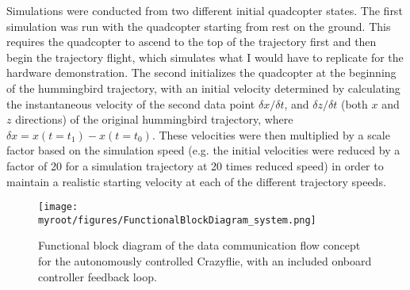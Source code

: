 Simulations were conducted from two different initial quadcopter states. The first simulation was run with the quadcopter starting from rest on the ground. This requires the quadcopter to ascend to the top of the trajectory first and then begin the trajectory flight, which simulates what I would have to replicate for the hardware demonstration. The second initializes the quadcopter at the beginning of the hummingbird trajectory, with an initial velocity determined by calculating the instantaneous velocity of the second data point $\delta x/\delta t$, and $\delta z/\delta t$ (both $x$ and $z$ directions) of the original hummingbird trajectory, where $\delta x = x(t = t_1) - x(t = t_0)$. These velocities were then multiplied by a scale factor based on the simulation speed (e.g. the initial velocities were reduced by a factor of 20 for a simulation trajectory at 20 times reduced speed) in order to maintain a realistic starting velocity at each of the different trajectory speeds.

\begin{figure}[h]
\begin{center}
\texttt{[image: \\myroot/figures/FunctionalBlockDiagram\_system.png]}
\end{center}
\caption{Functional block diagram of the data communication flow concept for the autonomously controlled Crazyflie, with an included onboard controller feedback loop.}
\label{fig:demonstration-2}
\end{figure}

